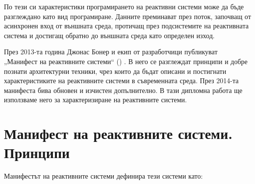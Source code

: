 По тези си характеристики програмирането на реактивни системи може да бъде разглеждано като вид  програмиране. Данните преминават през поток, започващ от асинхронен вход от външната среда, протичащ през подсистемите на реактивната система и достигащ обратно до външната среда като определен изход.

През 2013-та година Джонас Бонер и екип от разработчици публикуват „Манифест на реактивните системи“ () \cite{reactiveManifesto}. В него се разглеждат принципи и добре познати архитектурни техники, чрез които да бъдат описани и постигнати характеристиките на реактивните системи в съвременната среда. През 2014-та манифеста бива обновен и изчистен допълнително. В тази дипломна работа ще използваме него за характеризиране на реактивните системи.

\section{Манифест на реактивните системи. Принципи}

Манифестът на реактивните системи дефинира тези системи като:

